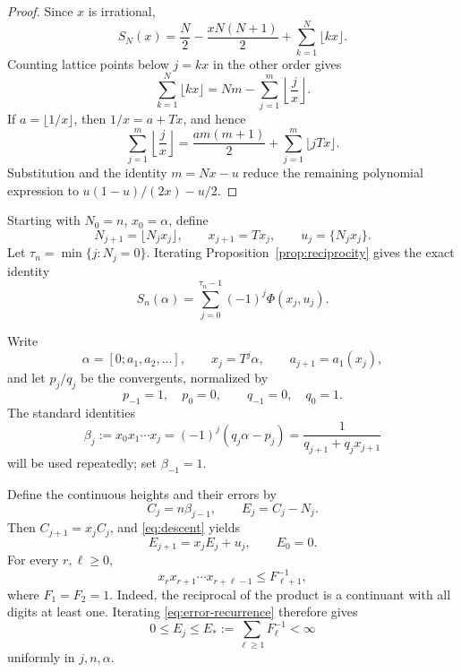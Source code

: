 \documentclass[11pt,a4paper]{amsart}
\theoremstyle{definition}
\theoremstyle{remark}
\begin{document}
\begin{proof}
Since $x$ is irrational,
\[
 S_N(x)=\frac N2-\frac{xN(N+1)}2+\sum_{k=1}^{N}\lfloor kx\rfloor.
\]
Counting lattice points below $j=kx$ in the other order gives
\[
 \sum_{k=1}^{N}\lfloor kx\rfloor
 =Nm-\sum_{j=1}^{m}\left\lfloor\frac jx\right\rfloor.
\]
If $a=\lfloor1/x\rfloor$, then $1/x=a+Tx$, and hence
\[
 \sum_{j=1}^{m}\left\lfloor\frac jx\right\rfloor
 =\frac{am(m+1)}2+\sum_{j=1}^{m}\lfloor jTx\rfloor.
\]
Substitution and the identity $m=Nx-u$ reduce the remaining polynomial
expression to $u(1-u)/(2x)-u/2$.
\end{proof}



Starting with $N_0=n$, $x_0=\alpha$, define
\begin{equation}\label{eq:descent}
 N_{j+1}=\lfloor N_jx_j\rfloor,
 \qquad x_{j+1}=Tx_j,
 \qquad u_j=\{N_jx_j\}.
\end{equation}
Let $\tau_n=\min\{j:N_j=0\}$.  Iterating
Proposition~\ref{prop:reciprocity} gives the exact identity
\begin{equation}\label{eq:exact-sum}
 S_n(\alpha)=\sum_{j=0}^{\tau_n-1}(-1)^j\Phi(x_j,u_j).
\end{equation}

Write
\[
 \alpha=[0;a_1,a_2,\ldots],\qquad x_j=T^j\alpha,
 \qquad a_{j+1}=a_1(x_j),
\]
and let $p_j/q_j$ be the convergents, normalized by
\[
 p_{-1}=1,\quad p_0=0,\qquad q_{-1}=0,\quad q_0=1.
\]
The standard identities
\begin{equation}\label{eq:beta}
 \beta_j:=x_0x_1\cdots x_j
 =(-1)^j(q_j\alpha-p_j)
 =\frac1{q_{j+1}+q_jx_{j+1}}
\end{equation}
will be used repeatedly; set $\beta_{-1}=1$.

Define the continuous heights and their errors by
\[
 C_j=n\beta_{j-1},\qquad E_j=C_j-N_j.
\]
Then $C_{j+1}=x_jC_j$, and \eqref{eq:descent} yields
\begin{equation}\label{eq:error-recurrence}
 E_{j+1}=x_jE_j+u_j,\qquad E_0=0.
\end{equation}
For every $r,\ell\ge0$,
\begin{equation}\label{eq:fibonacci-product}
 x_rx_{r+1}\cdots x_{r+\ell-1}\le F_{\ell+1}^{-1},
\end{equation}
where $F_1=F_2=1$.  Indeed, the reciprocal of the product is a
continuant with all digits at least one.  Iterating \eqref{eq:error-recurrence}
therefore gives
\begin{equation}\label{eq:E-bound}
 0\le E_j\le E_*:=\sum_{\ell\ge1}F_\ell^{-1}<\infty
\end{equation}
uniformly in $j,n,\alpha$.
\end{document}
